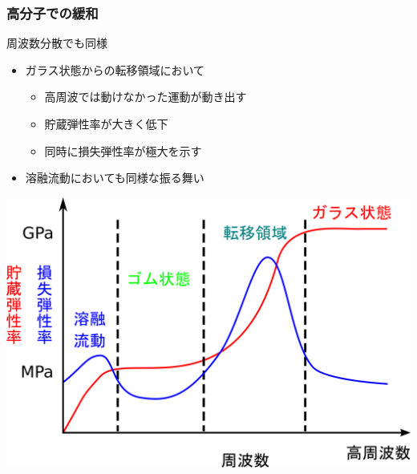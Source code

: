 \documentclass[12pt, dvipdfmx]{beamer}
\begin{document}
\begin{frame}
    \frametitle{高分子での緩和}
			\begin{block}{周波数分散でも同様}
				\begin{itemize}
					\item ガラス状態からの転移領域において
					\begin{itemize}
						\item 高周波では動けなかった運動が動き出す
						\item 貯蔵弾性率が大きく低下
						\item 同時に損失弾性率が極大を示す
					\end{itemize}
					\item 溶融流動においても同様な振る舞い
				\end{itemize}

				\vspace{2mm}
				\centering
				\includegraphics[width=.45\textwidth]{dynamic_ViscoElast_Freq.png}
			\end{block}
			
\end{frame}
\end{document}
